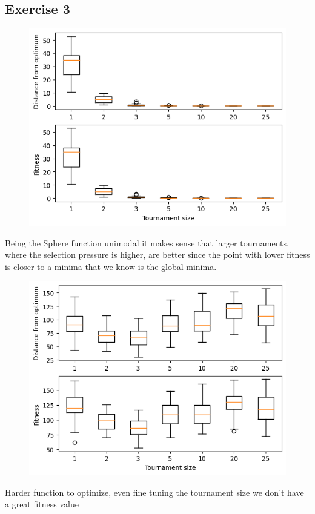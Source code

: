 \subsection{Exercise 3}
\begin{figure}[H]
    \centering
    \includegraphics[width=\linewidth]{images/lab2/tournament_sphere.png}
\end{figure}
Being the Sphere function unimodal it makes sense that larger tournaments, where the selection pressure is higher, are better since the point with lower fitness is closer to a minima that we know is the global minima.

\begin{figure}[H]
    \centering
    \includegraphics[width=\linewidth]{images/lab2/tournament_rastrigin.png}
\end{figure}
Harder function to optimize, even fine tuning the tournament size we don't have a great fitness value

